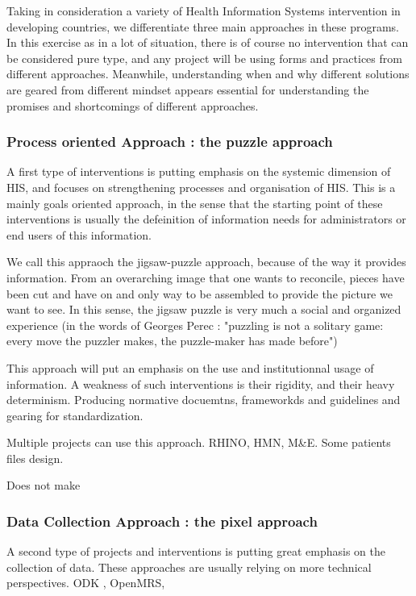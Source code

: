 Taking in consideration a variety of Health Information Systems intervention in developing countries, we differentiate three main approaches in these programs. In this exercise as in a lot of situation, there is of course no intervention that can be considered pure type, and any project will be using forms and practices from different approaches. Meanwhile, understanding when and why different solutions are geared from different mindset appears essential for understanding the promises and shortcomings of different approaches.

\subsubsection{Process oriented Approach : the puzzle approach}

A first type of interventions is putting emphasis on the systemic dimension of HIS, and focuses on strengthening processes and organisation of HIS. This is a mainly goals oriented approach, in the sense that the starting point of these interventions is usually the defeinition of information needs for administrators or end users of this information.

We call this appraoch the jigsaw-puzzle approach, because of the way it provides information. From an overarching image that one wants to reconcile, pieces have been cut and have on and only way to be assembled to provide the picture we want to see. In this sense, the jigsaw puzzle is very much a social and organized experience (in the words of Georges Perec : "puzzling is not a solitary game: every move the puzzler makes, the puzzle-maker has made before")

This approach will put an emphasis on the use and institutionnal usage of information. A weakness of such interventions is their rigidity, and their heavy determinism. Producing normative docuemtns, frameworkds and guidelines and gearing for standardization.

Multiple projects can use this approach. RHINO, HMN, M\&E. Some patients files design.

Does not make

\cite{rhino_introducing_2003}

\subsubsection{Data Collection Approach : the pixel approach}

A second type of projects and interventions is putting great emphasis on the collection of data. These approaches are usually relying on more technical perspectives. ODK , OpenMRS,

